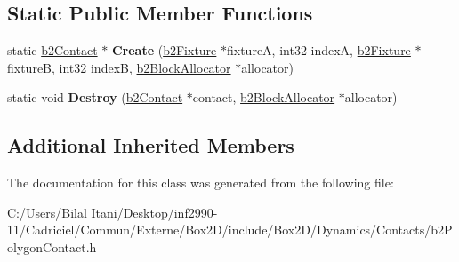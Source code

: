\subsection*{Static Public Member Functions}
\begin{DoxyCompactItemize}
\item 
static \hyperlink{classb2_contact}{b2\+Contact} $\ast$ {\bfseries Create} (\hyperlink{classb2_fixture}{b2\+Fixture} $\ast$fixtureA, int32 indexA, \hyperlink{classb2_fixture}{b2\+Fixture} $\ast$fixtureB, int32 indexB, \hyperlink{classb2_block_allocator}{b2\+Block\+Allocator} $\ast$allocator)\hypertarget{classb2_polygon_contact_a6f72e00b9f4870b214477073be35f592}{}\label{classb2_polygon_contact_a6f72e00b9f4870b214477073be35f592}

\item 
static void {\bfseries Destroy} (\hyperlink{classb2_contact}{b2\+Contact} $\ast$contact, \hyperlink{classb2_block_allocator}{b2\+Block\+Allocator} $\ast$allocator)\hypertarget{classb2_polygon_contact_a8f9687ed70a02550095cf80d3bbefc92}{}\label{classb2_polygon_contact_a8f9687ed70a02550095cf80d3bbefc92}

\end{DoxyCompactItemize}
\subsection*{Additional Inherited Members}


The documentation for this class was generated from the following file\+:\begin{DoxyCompactItemize}
\item 
C\+:/\+Users/\+Bilal Itani/\+Desktop/inf2990-\/11/\+Cadriciel/\+Commun/\+Externe/\+Box2\+D/include/\+Box2\+D/\+Dynamics/\+Contacts/b2\+Polygon\+Contact.\+h\end{DoxyCompactItemize}
